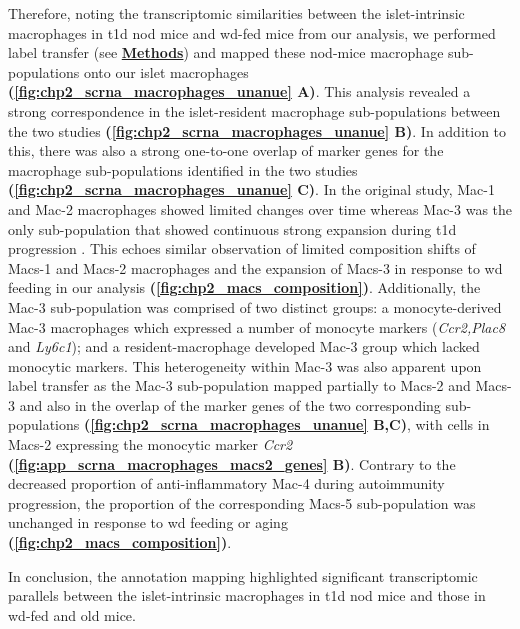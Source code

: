 \par Therefore, noting the transcriptomic similarities between the islet-intrinsic macrophages in \gls{t1d} \gls{nod} mice and \gls{wd}-fed mice from our analysis, we performed label transfer (see \hyperref[sec:chp2_methods]{\textbf{Methods}}) and mapped these \gls{nod}-mice macrophage sub-populations onto our islet macrophages \textbf{(\autoref{fig:chp2_scrna_macrophages_unanue} A)}. This analysis revealed a strong correspondence in the islet-resident macrophage sub-populations between the two studies \textbf{(\autoref{fig:chp2_scrna_macrophages_unanue} B)}. In addition to this, there was also a strong one-to-one overlap of marker genes for the macrophage sub-populations identified in the two studies \textbf{(\autoref{fig:chp2_scrna_macrophages_unanue} C)}. In the original study, Mac-1 and Mac-2 macrophages showed limited changes over time whereas Mac-3 was the only sub-population that showed continuous strong expansion during \gls{t1d} progression \textbf{\cite{zakharov_single-cell_2020}}. This echoes similar observation of limited composition shifts of Macs-1 and Macs-2 macrophages and the expansion of Macs-3 in response to \gls{wd} feeding in our analysis \textbf{(\autoref{fig:chp2_macs_composition})}. Additionally, the Mac-3 sub-population was comprised of two distinct groups: a monocyte-derived Mac-3 macrophages which expressed a number of monocyte markers (\textit{Ccr2,Plac8} and \textit{Ly6c1}); and a resident-macrophage developed Mac-3 group which lacked monocytic markers. This heterogeneity within Mac-3 was also apparent upon label transfer as the Mac-3 sub-population mapped partially to Macs-2 and Macs-3 and also in the overlap of the marker genes of the two corresponding sub-populations \textbf{(\autoref{fig:chp2_scrna_macrophages_unanue} B,C)}, with cells in Macs-2 expressing the monocytic marker \textit{Ccr2} \textbf{(\autoref{fig:app_scrna_macrophages_macs2_genes} B)}. Contrary to the decreased proportion of anti-inflammatory Mac-4 during autoimmunity progression, the proportion of the corresponding Macs-5 sub-population was unchanged in response to \gls{wd} feeding or aging \textbf{(\autoref{fig:chp2_macs_composition})}.\\
\par In conclusion, the annotation mapping highlighted significant transcriptomic parallels between the islet-intrinsic macrophages in \gls{t1d} \gls{nod} mice and those in \gls{wd}-fed and old mice. 





